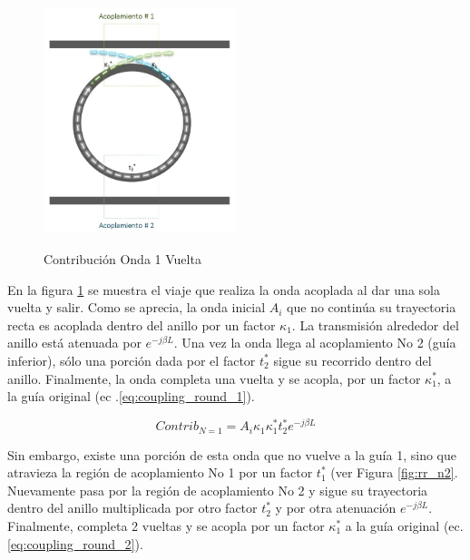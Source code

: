 \begin{figure}[h!]
\caption{Contribución Onda 1 Vuelta}
\centering
\includegraphics[width=0.5\textwidth,natwidth=573,natheight=674]{figs/rr_n1.jpg}
\label{fig:rr_n1}
\end{figure} 

En la figura \ref{fig:rr_n1} se muestra el viaje que realiza
la onda acoplada al dar una sola vuelta y salir. 
Como se aprecia, la onda inicial $A_i$ que no continúa su trayectoria recta es acoplada dentro 
del anillo por un factor $\kappa_1$. 
La transmisión alrededor del anillo está atenuada por $e^{-j \beta L}$.
Una vez la onda llega al acoplamiento No 2 (guía inferior), sólo una porción
dada por el factor $t_2^*$ sigue su recorrido dentro del anillo. 
Finalmente, la onda completa una vuelta y se acopla, por un factor $\kappa_1^*$, 
a la guía original (ec .\ref{eq:coupling_round_1}).

\begin{equation}
Contrib_{N=1} = A_i \kappa_1 \kappa_1^* t_2^* e^{-j \beta L}
\label{eq:coupling_round_1}
\end{equation} 

Sin embargo, existe una porción de esta onda que no vuelve a la guía 1, sino que atravieza 
la región de acoplamiento No 1 por un factor $t_1^*$ (ver Figura \ref{fig:rr_n2}. Nuevamente pasa por la región
de acoplamiento No 2 y sigue su trayectoria dentro del anillo multiplicada por otro factor
$t_2^*$ y por otra atenuación $e^{-j \beta L}$. 
Finalmente, completa 2 vueltas y se acopla por un factor $\kappa_1^*$ a la guía 
original (ec. \ref{eq:coupling_round_2}).

